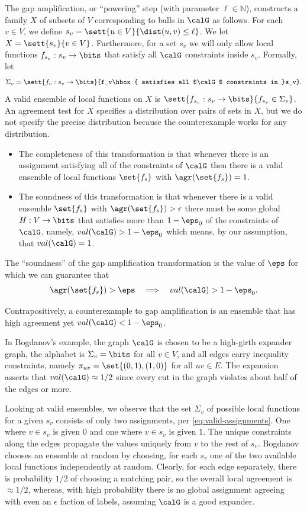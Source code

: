 The gap amplification, or ``powering'' step (with parameter $\ell\in\mathbb{N}$), constructs a family $X$ of subsets of $V$ corresponding to balls in $\calG$ as follows. For each $v\in V$, we define $s_v = \sett{u\in V}{\dist(u,v) \leq \ell}$. We let $X = \sett{s_v}{v\in V}$. Furthermore, for a set $s_v$ we will only allow local functions $f_{s_v}:s_v\to\bits$ that satisfy all $\calG$ constraints inside $s_v$. Formally, let
\begin{equation}\label{eq:valid-assignments}
    \Sigma_v = \sett{f_v:s_v\to\bits}{f_v\hbox{ satisfies all $\calG$ constraints in }s_v}.
\end{equation}
%
A valid ensemble of local functions on $X$ is $\sett{f_{s_v}:s_v\to\bits}{f_{s_v}\in \Sigma_v}$. An agreement test for $X$ specifies a distribution over pairs of sets in $X$, but we do not specify the precise distribution because the counterexample works for any distribution. 
\begin{itemize}
    \item The completeness of this transformation is that whenever there is an assignment satisfying all of the constraints of $\calG$ then there is a valid ensemble of local functions $\set{f_s}$ with $\agr(\set{f_s})=1$. 
    \item The soundness of this transformation is that whenever there is a valid ensemble $\set{f_s}$ with $\agr(\set{f_s})>\epsilon$ there must be some global $H:V\to\bits$ that satisfies more than $1-\eps_0$ of the constraints of $\calG$, namely, $val(\calG)>1-\eps_0$ which means, by our assumption, that $val(\calG)=1$. 
\end{itemize}
The ``soundness'' of the gap amplification transformation is the value of $\eps$ for which we can guarantee that 
\[ \agr(\set{f_s})>\eps \quad\Longrightarrow \quad val(\calG)>1-\eps_0.\]

Contrapositively, a counterexample to gap amplification is an ensemble that has high agreement yet $val(\calG)<1-\eps_0$. 

In Bogdanov's example, the graph $\calG$ is chosen to be a high-girth expander graph, the alphabet is $\Sigma_v=\bits$ for all $v\in V$, and all edges carry inequality constraints, namely $\pi_{uv}=\set{(0,1),(1,0)}$ for all $uv\in E$. The expansion asserts that $val(\calG) \approx 1/2$ since every cut in the graph violates about half of the edges or more. 

Looking at valid ensembles, we observe that the set $\Sigma_v$ of possible local functions for a given $s_v$ consists of only two assignments, per \eqref{eq:valid-assignments}. One where $v\in s_v$ is given $0$ and one where $v\in s_v$ is given $1$. The unique constraints along the edges propagate the values uniquely from $v$ to the rest of $s_v$. Bogdanov chooses an ensemble at random by choosing, for each $s_v$ one of the two available local functions independently at random. Clearly, for each edge separately,  there is probability $1/2$ of choosing a matching pair, so the overall local agreement is $\approx 1/2$, whereas, with high probability there is no global assignment agreeing with even an $\epsilon$ faction of labels, assuming $\calG$ is a good expander.\\

